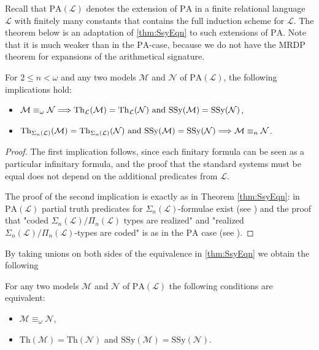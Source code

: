 \documentclass[11pt]{amsart}
\newcommand{\M}{\mathcal{M}}
\newcommand{\N}{\mathcal{N}}
\newcommand{\PA}{\mathrm{PA}}
\newcommand{\SSy}{\mathrm{SSy}}
\newcommand{\Th}{\mathrm{Th}}
\def\M{{\mathcal M}}
\def\N{{\mathcal N}}
\theoremstyle{remark}
\begin{document}
Recall that $\PA(\mathcal{L})$ denotes the extension of $\PA$ in a finite relational language $\mathcal{L}$ with finitely many constants that contains the full induction scheme for $\mathcal{L}$. The theorem below is an adaptation of \cref{thm:SsyEqn} to such extensions of $\PA$. Note that it is much weaker than in the $\PA$-case, because we do not have the MRDP theorem for expansions of the arithmetical signature.


    \begin{theorem} \label{thm:SsyEqn2} 
    For $2 \le n < \omega$ and any two models $\mathcal{M}$ and $\mathcal{N}$ of $\PA(\mathcal{L})$, the following implications hold:
    \begin{itemize}
        \item $\mathcal{M} \equiv_{\omega} \mathcal{N}\Longrightarrow \Th_{\mathcal{L}}(\mathcal{M}) = \Th_{\mathcal{L}}(\mathcal{N}) \textnormal{ and } \SSy(\mathcal{M}) = \SSy(\mathcal{N})$,
        \item $\Th_{\Sigma_{n}(\mathcal{L})}(\mathcal{M}) = \Th_{\Sigma_{n}(\mathcal{L})}(\mathcal{N}) \textnormal{ and }\SSy(\mathcal{M}) = \SSy(\mathcal{N})\Longrightarrow \mathcal{M} \equiv_{n} \mathcal{N}$.
    \end{itemize}
\end{theorem}
\begin{proof}
    The first implication follows, since each finitary formula can be seen as a particular infinitary formula, and the proof that the standard systems must be equal does not depend on the additional predicates from $\mathcal{L}$.
    
    The proof of the second implication is exactly as in Theorem \ref{thm:SsyEqn}: in $\PA(\mathcal{L})$ partial truth predicates for $\Sigma_n(\mathcal{L})$-formulae exist (see \cite[Section 1.11]{KS}) and the proof that "coded $\Sigma_n(\mathcal{L})/\Pi_n(\mathcal{L})$ types are realized" and "realized $\Sigma_n(\mathcal{L})/\Pi_n(\mathcal{L})$-types are coded" is as in the $\PA$ case (see \cite[Corollary 1.11.4]{KS}). 
\end{proof}

By taking unions on both sides of the equivalence in \cref{thm:SsyEqn} we obtain the following
\begin{corollary} \label{cor:SsyEq} 
    For any two models $\mathcal{M}$ and $\mathcal{N}$ of $\PA(\mathcal{L})$ the following conditions are equivalent:
    \begin{itemize}
        \item $\M \equiv_\omega \N$,
        \item $\Th(\M) = \Th(\N)$ and $\SSy(\mathcal{M}) = \SSy(\mathcal{N})$.
    \end{itemize}
    
\end{corollary}
\end{document}
